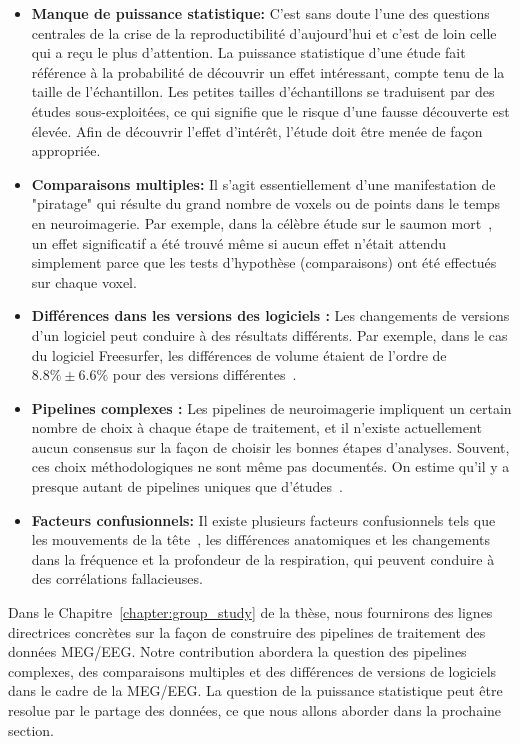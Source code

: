 \begin{itemize}[noitemsep,partopsep=0pt]
\item \textbf{Manque de puissance statistique:} C'est sans doute l'une des questions centrales de la crise de la reproductibilité d'aujourd'hui et c'est de loin celle qui a reçu le plus d'attention. La puissance statistique d'une étude fait référence à la probabilité de découvrir un effet intéressant, compte tenu de la taille de l'échantillon. Les petites tailles d'échantillons se traduisent par des études sous-exploitées, ce qui signifie que le risque d'une fausse découverte est élevée. Afin de découvrir l'effet d'intérêt, l'étude doit être menée de façon appropriée.

%
\item \textbf{Comparaisons multiples:} Il s'agit essentiellement d'une manifestation de "piratage" qui résulte du grand nombre de voxels ou de points dans le temps en neuroimagerie. Par exemple, dans la célèbre étude sur le saumon mort~\citep{bennett2009neural}, un effet significatif a été trouvé même si aucun effet n'était attendu simplement parce que les tests d'hypothèse (comparaisons) ont été effectués sur chaque voxel.
%
\item \textbf{Différences dans les versions des logiciels :} Les changements de versions d’un logiciel peut conduire à des résultats différents. Par exemple, dans le cas du logiciel Freesurfer, les différences de volume étaient de l'ordre de $8.8\% \pm 6.6\%$ pour des versions différentes~\citep{gronenschild2012effects}.
%
\item \textbf{Pipelines complexes :} Les pipelines de neuroimagerie impliquent un certain nombre de choix à chaque étape de traitement, et il n'existe actuellement aucun consensus sur la façon de choisir les bonnes étapes d’analyses. Souvent, ces choix méthodologiques ne sont même pas documentés. On estime qu'il y a presque autant de pipelines uniques que d'études~\citep{Carp2012289}.
\item \textbf{Facteurs confusionnels:} Il existe plusieurs facteurs confusionnels tels que les mouvements de la tête~\citep{yendiki2014spurious}, les différences anatomiques et les changements dans la fréquence et la profondeur de la respiration, qui peuvent conduire à des corrélations fallacieuses.
\end{itemize}

Dans le Chapitre~\ref{chapter:group_study} de la thèse, nous fournirons des lignes directrices concrètes sur la façon de construire des pipelines de traitement des données MEG/EEG. Notre contribution abordera la question des pipelines complexes, des comparaisons multiples et des différences de versions de logiciels dans le cadre de la  MEG/EEG. La question de la puissance statistique peut être resolue par le partage des données, ce que nous allons aborder  dans la prochaine section.

